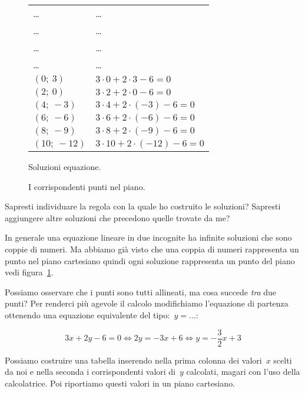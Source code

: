 \begin{inaccessibleblock}
 \begin{figure}[h]
 \centering
 \begin{minipage}[]{.50\textwidth}
\begin{tabular}{ll}
\dots & \dots \\
\dots & \dots \\
\dots & \dots \\
\dots & \dots \\
$(0; ~3)$   & $3 \cdot 0 + 2 \cdot 3 - 6 = 0$     \\
$(2; ~0)$   & $3 \cdot 2 + 2 \cdot 0 - 6 = 0$     \\
$(4;~-3)$   & $3 \cdot 4 + 2 \cdot (-3) - 6 = 0$  \\
$(6;~-6)$   & $3 \cdot 6 + 2 \cdot (-6) - 6 = 0$  \\
$(8;~-9)$   & $3 \cdot 8 + 2 \cdot (-9) - 6 = 0$  \\
$(10;~-12)$ & $3 \cdot 10 + 2 \cdot (-12) - 6 = 0$
\end{tabular}
  \caption{Soluzioni equazione.}\label{fig:soluzioniequazione}
 \end{minipage}
 \begin{minipage}[]{.40\textwidth}
  \centering
  \caption{I corrispondenti punti nel piano.}\label{fig:puntiallineati}
 \end{minipage}
\end{figure}
\end{inaccessibleblock}


Sapresti individuare la regola con la quale ho costruito le soluzioni? 
Sapresti aggiungere altre soluzioni che precedono quelle trovate da me?

In generale una equazione lineare in due incognite ha infinite soluzioni che 
sono coppie di numeri. Ma abbiamo già visto che una coppia di numeri 
rappresenta un punto nel piano cartesiano quindi ogni soluzione rappresenta 
un punto del piano vedi figura~\ref{fig:puntiallineati}.

Possiamo osservare che i punti sono tutti allineati, ma cosa succede 
\emph{tra} due punti? Per renderci più agevole il calcolo modifichiamo
l'equazione di partenza ottenendo una equazione equivalente del 
tipo:~$y = \dots$:

\[3x + 2y - 6 = 0 \Leftrightarrow 2y = -3x +6 \Leftrightarrow 
 y = -\frac{3}{2}x +3\]

Possiamo costruire una tabella inserendo nella prima colonna dei valori~$x$ 
scelti da noi e nella seconda i corrispondenti valori di~$y$ calcolati, 
magari con l'uso della calcolatrice. Poi riportiamo questi valori in un 
piano cartesiano.

